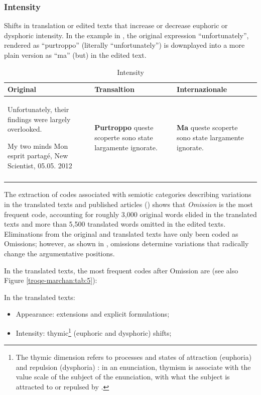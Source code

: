 \documentclass[output=paper]{LSP/langsci}
\begin{document}
\subsubsection{Intensity}

Shifts in translation or edited texts that increase or decrease euphoric or dysphoric intensity. In the example in , the original expression ``unfortunately'', rendered as ``purtroppo'' (literally ``unfortunately'') is downplayed into a more plain version as ``ma'' (but) in the edited text.

%
%
\begin{table}
 \tiny
 \caption{Intensity}
 \label{troqe-marchan:tab:9}
\begin{tabularx}{\textwidth}{XXX}
\lsptoprule
 Original & Transaltion & Internazionale\\
\midrule
Unfortunately, their findings were largely overlooked.

My two minds Mon esprit partagé, New Scientist, 05.05. 2012 &  \textbf{Purtroppo} queste scoperte sono state largamente ignorate. & \textbf{Ma} queste scoperte sono state largamente ignorate.\\
\lspbottomrule
\end{tabularx}
\end{table}

The extraction of codes associated with semiotic categories describing variations in the translated texts and published articles () shows that \textit{Omission} is the most frequent code, accounting for roughly 3,000 original words elided in the translated texts and more than 5,500 translated words omitted in the edited texts. Eliminations from the original and translated texts have only been coded as Omissions; however, as shown in , omissions determine variations that radically change the argumentative positions. 

In the translated texts, the most frequent codes after Omission are (see also Figure \ref{troqe-marchan:tab:5}): 

In the translated texts:

	\begin{itemize}

	\item Appearance: extensions and explicit formulations; 

	\item Intensity: thymic\footnote{The thymic dimension refers to processes and states of attraction (euphoria) and repulsion (dysphoria) : in an enunciation, thymism is associate with the value scale of the subject of the enunciation, with what the subject is attracted to or repulsed by \citet[93]{Greimas1970}.} (euphoric and dysphoric) shifts;
    
    \end{itemize}
\end{document}
